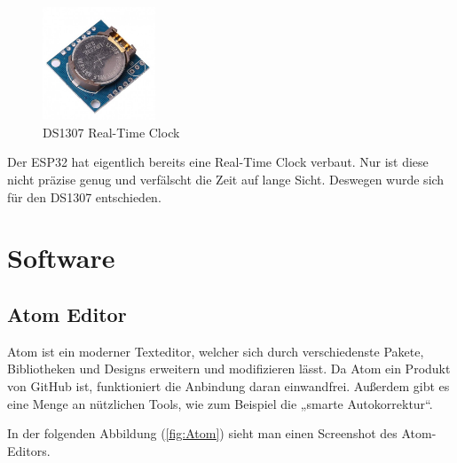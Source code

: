     \begin{figure}[H]
        \centering
        \includegraphics[width=0.3\textwidth]{./media/images/DS1307.jpg}
        \caption{DS1307 Real-Time Clock \cite{bib:DS1307}}
        \label{fig:DS1307}
    \end{figure}
    
    Der ESP32 hat eigentlich bereits eine Real-Time Clock verbaut. Nur ist diese nicht präzise genug und verfälscht die Zeit auf lange Sicht. Deswegen wurde sich für den DS1307 entschieden. 

\pagebreak

\section{Software}

    \subsection{Atom Editor}\label{ref:Atom}
    
        Atom ist ein moderner Texteditor, welcher sich durch verschiedenste Pakete, Bibliotheken und Designs erweitern und modifizieren lässt. Da Atom ein Produkt von GitHub ist, funktioniert die Anbindung daran einwandfrei. Außerdem gibt es eine Menge an nützlichen Tools, wie zum Beispiel die „smarte Autokorrektur“.  
        
        \begin{flushright}
            \cite{bib:AtomTipps}
        \end{flushright}
        
        In der folgenden Abbildung (\ref{fig:Atom}) sieht man einen Screenshot des Atom-Editors. 
    
